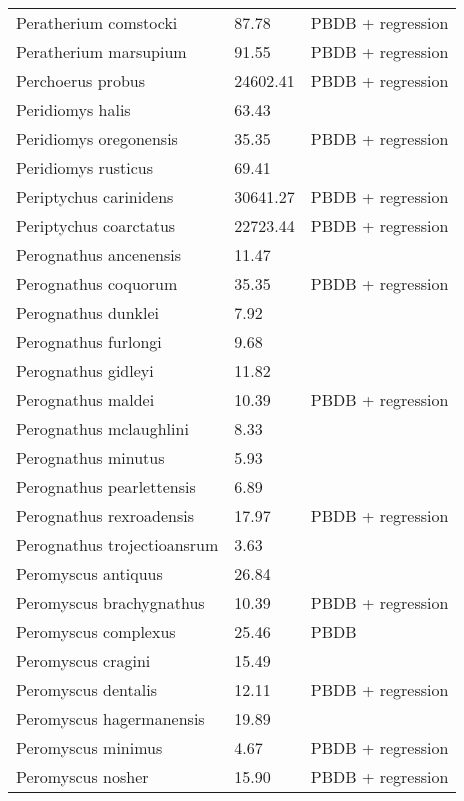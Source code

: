 \documentclass{article}
\begin{document}
\begin{center}
\begin{longtable}{p{} p{} p{}}
    Peratherium comstocki & 87.78 & PBDB + regression \\ 
    Peratherium marsupium & 91.55 & PBDB + regression \\ 
    Perchoerus probus & 24602.41 & PBDB + regression \\ 
    Peridiomys halis & 63.43 & \cite{Tomiya2013} \\ 
    Peridiomys oregonensis & 35.35 & PBDB + regression \\ 
    Peridiomys rusticus & 69.41 & \cite{Tomiya2013} \\ 
    Periptychus carinidens & 30641.27 & PBDB + regression \\ 
    Periptychus coarctatus & 22723.44 & PBDB + regression \\ 
    Perognathus ancenensis & 11.47 & \cite{Tomiya2013} \\ 
    Perognathus coquorum & 35.35 & PBDB + regression \\ 
    Perognathus dunklei & 7.92 & \cite{Tomiya2013} \\ 
    Perognathus furlongi & 9.68 & \cite{Tomiya2013} \\ 
    Perognathus gidleyi & 11.82 & \cite{Tomiya2013} \\ 
    Perognathus maldei & 10.39 & PBDB + regression \\ 
    Perognathus mclaughlini & 8.33 & \cite{Tomiya2013} \\ 
    Perognathus minutus & 5.93 & \cite{Tomiya2013} \\ 
    Perognathus pearlettensis & 6.89 & \cite{Tomiya2013} \\ 
    Perognathus rexroadensis & 17.97 & PBDB + regression \\ 
    Perognathus trojectioansrum & 3.63 & \cite{Tomiya2013} \\ 
    Peromyscus antiquus & 26.84 & \cite{Tomiya2013} \\ 
    Peromyscus brachygnathus & 10.39 & PBDB + regression \\ 
    Peromyscus complexus & 25.46 & PBDB \\ 
    Peromyscus cragini & 15.49 & \cite{Tomiya2013} \\ 
    Peromyscus dentalis & 12.11 & PBDB + regression \\ 
    Peromyscus hagermanensis & 19.89 & \cite{Tomiya2013} \\ 
    Peromyscus minimus & 4.67 & PBDB + regression \\ 
    Peromyscus nosher & 15.90 & PBDB + regression \\ 

\end{longtable}
\end{center}
\end{document}
